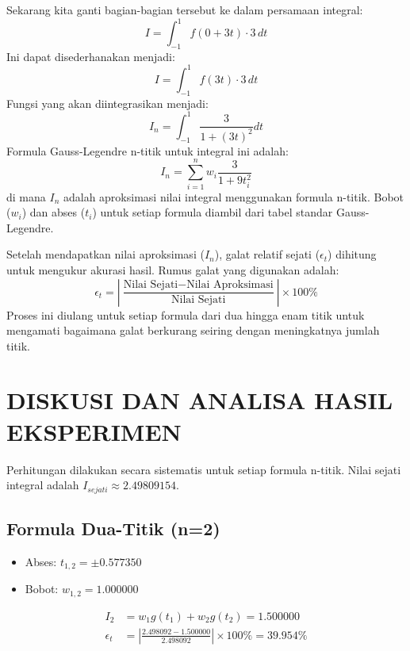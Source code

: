 \documentclass[conference]{IEEEtran}
\begin{document}
\noindent
Sekarang kita ganti bagian-bagian tersebut ke dalam persamaan integral:
\begin{equation}
I = \int_{-1}^{1} f(0 + 3t) \cdot 3 \, dt
\end{equation}
Ini dapat disederhanakan menjadi:
\begin{equation}
I = \int_{-1}^{1} f(3t) \cdot 3 \, dt
\end{equation}
Fungsi yang akan diintegrasikan menjadi:
\begin{equation}
    I_n = \int_{-1}^{1} \frac{3}{1+(3t)^2} dt
\end{equation}
Formula Gauss-Legendre n-titik untuk integral ini adalah:
\begin{equation}
    I_n = \sum_{i=1}^{n} w_i \frac{3}{1+9t_i^2}
\end{equation}
di mana $I_n$ adalah aproksimasi nilai integral menggunakan formula n-titik. Bobot ($w_i$) dan abses ($t_i$) untuk setiap formula diambil dari tabel standar Gauss-Legendre.

Setelah mendapatkan nilai aproksimasi ($I_n$), galat relatif sejati ($\epsilon_t$) dihitung untuk mengukur akurasi hasil. Rumus galat yang digunakan adalah:
\begin{equation}
    \epsilon_t = \left| \frac{\text{Nilai Sejati} - \text{Nilai Aproksimasi}}{\text{Nilai Sejati}} \right| \times 100\%
\end{equation}
Proses ini diulang untuk setiap formula dari dua hingga enam titik untuk mengamati bagaimana galat berkurang seiring dengan meningkatnya jumlah titik.


\section{DISKUSI DAN ANALISA HASIL EKSPERIMEN}
Perhitungan dilakukan secara sistematis untuk setiap formula n-titik. Nilai sejati integral adalah $I_{sejati} \approx 2.49809154$.

\subsection{Formula Dua-Titik (n=2)}
\begin{itemize}
    \item Abses: $t_{1,2} = \pm 0.577350$
    \item Bobot: $w_{1,2} = 1.000000$
\end{itemize}
\begin{align*}
    I_2 &= w_1 g(t_1) + w_2 g(t_2) = \mathbf{1.500000} \\
    \epsilon_t &= \left| \frac{2.498092 - 1.500000}{2.498092} \right| \times 100\% = \mathbf{39.954\%}
\end{align*}
\end{document}
